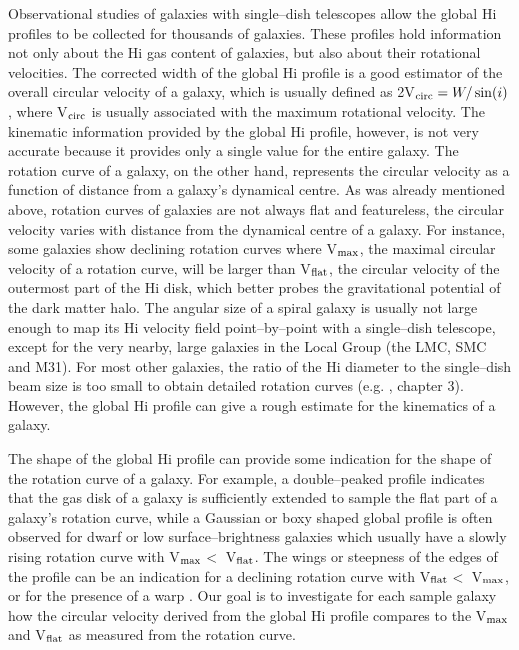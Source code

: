 \documentclass[usenatbib,useAMS]{mnras}
\begin{document}
 Observational studies of galaxies with single--dish telescopes
allow the global H{\sc i} profiles to be collected for thousands of
galaxies.  These profiles hold information not only about the H{\sc i}
gas content of galaxies, but also about their rotational velocities.
The corrected width of the global H{\sc i} profile is a good estimator
of the overall circular velocity of a galaxy, which is usually defined
as 2V$_{\rm circ} = W/\sin(i)$, where V$_{\rm circ}$ is usually
associated with the maximum rotational velocity. The kinematic
information provided by the global H{\sc i} profile, however, is not
very accurate because it provides only a single value for the entire
galaxy.  The rotation curve of a galaxy, on the other hand, represents
the circular velocity as a function of distance from a galaxy's
dynamical centre.  As was already mentioned above, rotation curves of
galaxies are not always flat and featureless, the circular velocity
varies with distance from the dynamical centre of a galaxy.  For
instance, some galaxies show declining rotation curves where V$_{\rm
max}$, the maximal circular velocity of a rotation curve, will be larger
than V$_{\rm flat}$, the circular velocity of the outermost part of the
H{\sc i} disk, which better probes the gravitational potential of the
dark matter halo.  The angular size of a spiral galaxy is usually not
large enough to map its H{\sc i} velocity field point--by--point with a
single--dish telescope, except for the very nearby, large galaxies in
the Local Group (the LMC, SMC and M31).  For most other galaxies, the
ratio of the H{\sc i} diameter to the single--dish beam size is too
small to obtain detailed rotation curves (e.g.  \citet{bosma78}, chapter
3).  However, the global H{\sc i} profile can give a rough estimate for
the kinematics of a galaxy.

The shape of the global H{\sc i} profile can provide some indication for
the shape of the rotation curve of a galaxy.  For example, a
double--peaked profile indicates that the gas disk of a galaxy is
sufficiently extended to sample the flat part of a galaxy's rotation
curve, while a Gaussian or boxy shaped global profile is often observed
for dwarf or low surface--brightness galaxies which usually have a
slowly rising rotation curve with V$_{\rm max}$$<$ V$_{\rm flat}$.  The
wings or steepness of the edges of the profile can be an indication for
a declining rotation curve with V$_{\rm flat}$$<$ V$_{\rm max}$, or for
the presence of a warp \citep{v01}. Our goal is to investigate for
each sample galaxy how the circular velocity derived from the global
H{\sc i} profile compares to the V$_{\rm max}$ and V$_{\rm flat}$ as
measured from the rotation curve.
\end{document}
